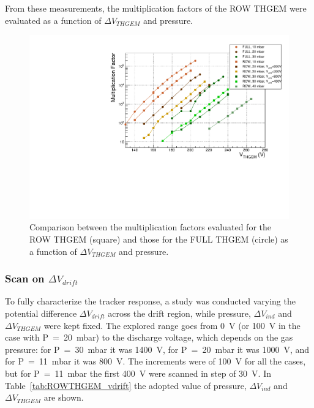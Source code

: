 \documentclass[a4paper, 11 pt]{article}
\newcommand{\Vind}{$\Delta V_{ind}$}
\newcommand{\Vthgem}{$\Delta V_{THGEM}$}
\newcommand{\Vdrift}{$ \Delta V_{drift}$}
\begin{document}
From these measurements, the multiplication factors of the ROW THGEM were evaluated as a function of \Vthgem{} and pressure. 




\begin{figure}[!t]
	\centering
	\includegraphics[width=\textwidth]{Immagini/MFvsTHGEM_FULLandROW_bis.pdf}
	\caption{Comparison between the multiplication factors evaluated for the ROW THGEM (square) and those for the FULL THGEM (circle) as a function of \Vthgem{} and pressure.}
	\label{fig:multiplication_factor_FULLandROW}
\end{figure}










\clearpage

\subsubsection{Scan on \Vdrift}

To fully characterize the tracker response, a study was conducted varying the potential difference \Vdrift{} across the drift region, while pressure, \Vind{} and \Vthgem{} were kept fixed.
The explored range goes from 0~V (or 100~V in the case with P~=~20~mbar) to the discharge voltage, which depends on the gas pressure: for P~=~30~mbar it was 1400~V, for P~=~20~mbar it was 1000~V, and for P~=~11~mbar it was 800~V.
The increments were of 100~V for all the cases, but for P~=~11~mbar the first 400~V were scanned in step of 30~V.
In Table~\ref{tab:ROWTHGEM_vdrift} the adopted value of pressure, \Vind{} and \Vthgem{} are shown.
\end{document}
